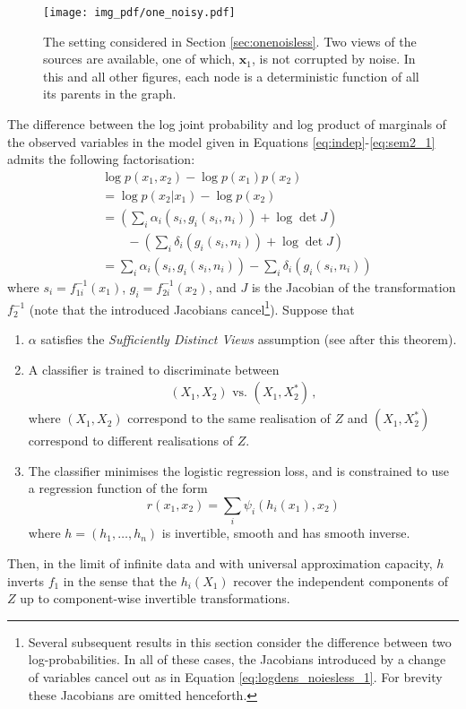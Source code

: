 \begin{figure}[t!]
	\centering
	\texttt{[image: img\_pdf/one\_noisy.pdf]}
	\caption{The setting considered in Section \ref{sec:onenoisless}. Two views of the sources are available, one of which, $\bm{x}_1$, is not corrupted by noise. In this and all other figures, each node is a deterministic function of all its parents in the graph.
	}
	\label{fig:generalized_hsr_basic}
\end{figure}

\medskip

\begin{theorem}
	\label{thm:noiseless1}
	The difference between the log joint probability and log product of marginals of the observed variables in the model given in Equations \ref{eq:indep}-\ref{eq:sem2_1} admits the following factorisation:
	\begin{align}
	&\log p({x}_1, {x}_2) - \log p({x}_1) p({x}_2) \nonumber \\
	&= \log p({x}_2 | {x}_1) - \log p({x}_2) \nonumber\\
	&= \left(\sum_i \alpha_i(s_{i}, g_i(s_i, n_i)) + \log \det J \right) \nonumber\\
	&\qquad - \left( \sum_i \delta_i(g_i(s_i, n_i)) + \log \det J\right) \nonumber\\
	&= \sum_i \alpha_i(s_{i}, g_i(s_i, n_i)) - \sum_i \delta_i(g_i(s_i, n_i))\label{eq:logdens_noiesless_1} \,
	\end{align}
	where $s_i=f^{-1}_{1i}({x}_1)$, $g_i=f^{-1}_{2i}({x}_2)$,
	and $J$ is the Jacobian of the transformation $f^{-1}_2$ (note that the introduced Jacobians cancel\footnote{Several subsequent results in this section consider the difference between two log-probabilities.
In all of these cases, the Jacobians introduced by a change of variables cancel out as in Equation \ref{eq:logdens_noiesless_1}.
For brevity these Jacobians are omitted henceforth.}).
	Suppose that
	\begin{enumerate}
		\item $\alpha$ satisfies the \emph{Sufficiently Distinct Views} assumption (see after this theorem).
		\item A classifier is trained to discriminate between
		\begin{align*}
		(X_{1},X_{2}) \text{ vs. } (X_{1},X_{2}^{*})\,,
		\end{align*}
		where $({X}_{1},{X}_{2})$ correspond to the same realisation of $Z$ and $({X}_{1},{X}_{2}^{*})$ correspond to different realisations of ${Z}$.
		\item The classifier minimises the logistic regression loss, and is constrained to use a regression function of the form
		\begin{equation*}
		r({x}_{1},{x}_{2})=\sum_{i}\psi_{i}(h_{i}({x}_{1}),{x}_{2})
		\end{equation*}
		where ${h} =(h_{1}, \ldots, h_{n})$  is invertible, smooth and has smooth inverse.
	\end{enumerate}
	
	Then, in the limit of infinite data and with universal approximation capacity, $h$ inverts ${f}_1$ in the sense that the $h_{i}(X_1)$ recover the independent components of $Z$ up to component-wise invertible transformations.
\end{theorem}
